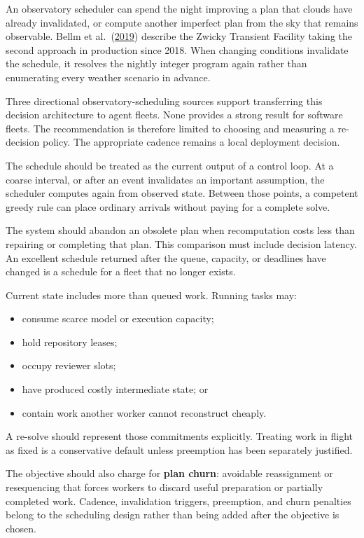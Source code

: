 An observatory scheduler can spend the night improving a plan that clouds have already invalidated, or compute another imperfect plan from the sky that remains observable. Bellm et al.~(\href{https://arxiv.org/abs/1905.02209}{2019}) describe the Zwicky Transient Facility taking the second approach in production since 2018. When changing conditions invalidate the schedule, it resolves the nightly integer program again rather than enumerating every weather scenario in advance.

Three directional observatory-scheduling sources support transferring this decision architecture to agent fleets. None provides a strong result for software fleets. The recommendation is therefore limited to choosing and measuring a re-decision policy. The appropriate cadence remains a local deployment decision.

The schedule should be treated as the current output of a control loop. At a coarse interval, or after an event invalidates an important assumption, the scheduler computes again from observed state. Between those points, a competent greedy rule can place ordinary arrivals without paying for a complete solve.

The system should abandon an obsolete plan when recomputation costs less than repairing or completing that plan. This comparison must include decision latency. An excellent schedule returned after the queue, capacity, or deadlines have changed is a schedule for a fleet that no longer exists.

Current state includes more than queued work. Running tasks may:

\begin{itemize}
\tightlist
\item
  consume scarce model or execution capacity;
\item
  hold repository leases;
\item
  occupy reviewer slots;
\item
  have produced costly intermediate state; or
\item
  contain work another worker cannot reconstruct cheaply.
\end{itemize}

A re-solve should represent those commitments explicitly. Treating work in flight as fixed is a conservative default unless preemption has been separately justified.

The objective should also charge for \textbf{plan churn}: avoidable reassignment or resequencing that forces workers to discard useful preparation or partially completed work. Cadence, invalidation triggers, preemption, and churn penalties belong to the scheduling design rather than being added after the objective is chosen.

